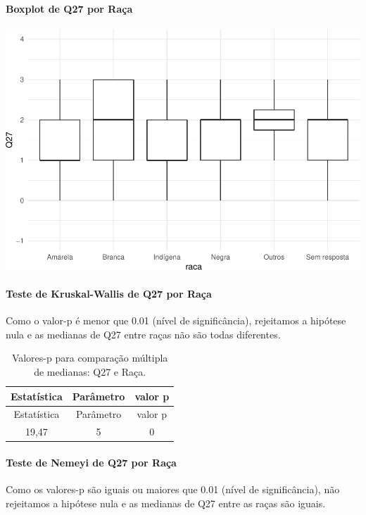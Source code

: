 \documentclass[]{article}
\let\oldparagraph\paragraph
\renewcommand{\paragraph}[1]{\oldparagraph{#1}\mbox{}}
\begin{document}
\hypertarget{boxplot-de-q27-por-rauxe7a}{%
\paragraph{Boxplot de Q27 por Raça}\label{boxplot-de-q27-por-rauxe7a}}

\begin{center}\includegraphics[width=0.75\linewidth]{relatorio_covid19_files/figure-latex/unnamed-chunk-814-1} \end{center}

\hypertarget{teste-de-kruskal-wallis-de-q27-por-rauxe7a}{%
\paragraph{Teste de Kruskal-Wallis de Q27 por Raça}\label{teste-de-kruskal-wallis-de-q27-por-rauxe7a}}

Como o valor-p é menor que 0.01 (nível de significância), rejeitamos a hipótese nula e as medianas de Q27 entre raças não são todas diferentes.

\begin{longtable}[]{@{}ccc@{}}
\caption{\label{tab:unnamed-chunk-816}Valores-p para comparação múltipla de medianas: Q27 e Raça.}\tabularnewline
\toprule
Estatística & Parâmetro & valor p\tabularnewline
\midrule
\endfirsthead
\toprule
Estatística & Parâmetro & valor p\tabularnewline
\midrule
\endhead
19,47 & 5 & 0\tabularnewline
\bottomrule
\end{longtable}

\hypertarget{teste-de-nemeyi-de-q27-por-rauxe7a}{%
\paragraph{Teste de Nemeyi de Q27 por Raça}\label{teste-de-nemeyi-de-q27-por-rauxe7a}}

Como os valores-p são iguais ou maiores que 0.01 (nível de significância), não rejeitamos a hipótese nula e as medianas de Q27 entre as raças são iguais.
\end{document}
